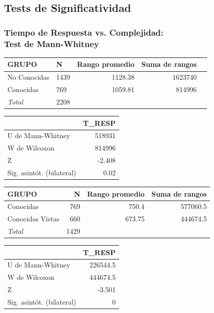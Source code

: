 \documentclass[10pt]{beamer}
\begin{document}
    \subsection{Tests de Significatividad}

      \begin{frame}
      \tiny
	  \frametitle{Tiempo de Respuesta vs. Complejidad:\\Test de Mann-Whitney}
	\begin{table}
	  \begin{tabular}[t]{|l|l|r|r|r|}
	    \hline
		\textbf{GRUPO} & \textbf{N} & \textbf{Rango promedio} & \textbf{Suma de rangos} \\ \hline
		No Conocidas & 1439 & 1128.38 & 1623740 \\ \hline
		Conocidas & 769 & 1059.81 & 814996 \\ \hline
		\textit{Total} & 2208 &   &   \\ \hline
	  \end{tabular}   \begin{tabular}[t]{|l|r|}
	    \hline
		& \textbf{T\_RESP} \\ \hline
	      U de Mann-Whitney & 518931 \\ \hline
	      W de Wilcoxon & 814996 \\ \hline
	      Z & -2.408 \\ \hline
	      Sig. asintót. (bilateral) & 0.02 \\ \hline
	  \end{tabular}
	\end{table}

	\begin{table}
	  \begin{tabular}[t]{|l|r|r|r|}
	    \hline
		\textbf{GRUPO} & \textbf{N} & \textbf{Rango promedio} & \textbf{Suma de rangos} \\ \hline
		Conocidas & 769 & 750.4 & 577060.5 \\ \hline
		Conocidas Vistas & 660 & 673.75 & 444674.5 \\ \hline
		\textit{Total} & 1429 &   &   \\ \hline
	  \end{tabular}   \begin{tabular}[t]{|l|r|}
	    \hline
		& \textbf{T\_RESP} \\ \hline
	      U de Mann-Whitney & 226544.5 \\ \hline
	      W de Wilcoxon & 444674.5 \\ \hline
	      Z & -3.501 \\ \hline
	      Sig. asintót. (bilateral) & 0 \\ \hline
	  \end{tabular}
	\end{table}


\end{frame}
\end{document}
